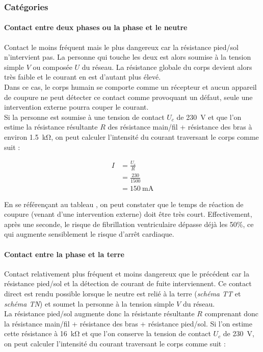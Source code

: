 \subsubsection{Catégories}



\paragraph{Contact entre deux phases ou la phase et le neutre} 
Contact le moins fréquent mais le plus dangereux car la résistance pied/sol n'intervient pas. La personne qui touche les deux est alors soumise à la tension simple $V$ ou composée $U$ du réseau. La résistance globale du corps devient alors très faible et le courant en est d'autant plus élevé.\\ Dans ce cas, le corps humain se comporte comme un récepteur et aucun appareil de coupure ne peut détecter ce contact comme provoquant un défaut, seule une intervention externe pourra couper le courant.\\

Si la personne est soumise à une tension de contact $U_c$ de \SI{230}{\volt} et que l'on estime la résistance résultante $R$ des résistance main/fil + résistance des bras à environ \SI{1,5}{\kilo\ohm}, on peut calculer l'intensité du courant traversant le corps comme suit :

\begin{align*}
I 	&= \frac{U_c}{R} \\
	&= \frac{230}{1500} \\
	&= \SI{150}{\milli\ampere}
\end{align*}

En se référençant au tableau , on peut constater que le temps de réaction de coupure (venant d'une intervention externe) doit être très court. Effectivement, après une seconde, le risque de fibrillation ventriculaire dépasse déjà les 50\%, ce qui augmente sensiblement le risque d'arrêt cardiaque.



\paragraph{Contact entre la phase et la terre}
Contact relativement plus fréquent et moins dangereux que le précédent car la résistance pied/sol et la détection de courant de fuite interviennent. Ce contact direct est rendu possible lorsque le neutre est relié à la terre (\emph{schéma TT} et \emph{schéma TN}) et soumet la personne à la tension simple $V$ du réseau.\\
La résistance pied/sol augmente donc la résistante résultante $R$ comprenant donc la résistance main/fil + résistance des bras + résistance pied/sol. Si l'on estime cette résistance à \SI{16}{\kilo\ohm} et que l'on conserve la tension de contact $U_c$ de \SI{230}{\volt}, on peut calculer l'intensité du courant traversant le corps comme suit :

